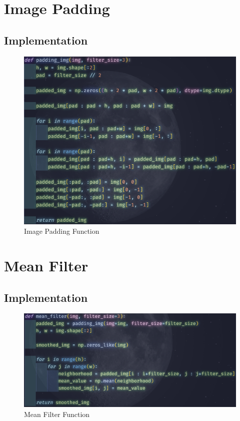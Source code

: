 \section{Image Padding}
\subsection{Implementation}
\begin{figure} [!h]
    \centering
    \includegraphics[width=1\textwidth]{img/code/pad.png}
    \caption{Image Padding Function}
\end{figure}

\newpage
\section{Mean Filter}
\subsection{Implementation}
\begin{figure} [!h]
    \centering
    \includegraphics[width=1\textwidth]{img/code/mean.png}
    \caption{Mean Filter Function}
\end{figure}

